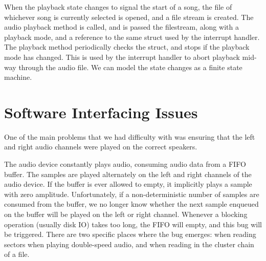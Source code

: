 \documentclass[12pt]{article}
\begin{document}
When the playback state changes to signal the start of a song,
the file of whichever song is currently selected is opened,
and a file stream is created.
The audio playback method is called, and is passed the filestream,
along with a playback mode, and a reference to the same struct used by the
interrupt handler.
The playback method periodically checks the struct, and stops if the playback
mode has changed.
This is used by the interrupt handler to abort playback mid-way through the audio
file.
We can model the state changes as a finite state machine.


\section{Software Interfacing Issues}

One of the main problems that we had difficulty with was ensuring that the
left and right audio channels were played on the correct speakers.

The audio device constantly plays audio, consuming audio data from
a FIFO buffer.
The samples are played alternately on the left and right channels of
the audio device.
If the buffer is ever allowed to empty, it implicitly plays a sample with zero
amplitude.
Unfortunately, if a non-deterministic number of samples are consumed from the
buffer, we no longer know whether the next sample enqueued on the buffer will
be played on the left or right channel.
Whenever a blocking operation (usually disk IO) takes too long, the FIFO will
empty, and this bug will be triggered.
There are two specific places where the bug emerges: when reading sectors when
playing double-speed audio, and when reading in the cluster chain of a file.

\end{document}
